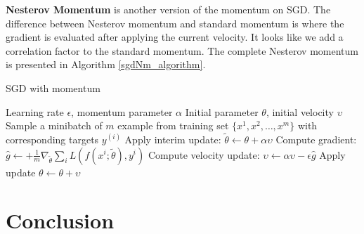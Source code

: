 \textbf{Nesterov Momentum} is another version of the momentum on SGD. The difference between Nesterov momentum and standard momentum is where the gradient is evaluated after applying the current velocity. It looks like we add a correlation factor to the standard momentum. The complete Nesterov momentum is presented in Algorithm \ref{sgdNm_algorithm}.

\begin{algorithm}
	\caption{SGD with momentum}
	\label{sgdNm_algorithm}
	\begin{algorithmic}
		\REQUIRE Learning rate $\epsilon$, momentum parameter $\alpha$
		\REQUIRE Initial parameter $\theta$, initial velocity $\upsilon$
			\STATE Sample a minibatch of $m$ example from training set $\{ x^1,x^2,\ldots, x^m \}$ with corresponding targets $y^{(i)}$
			\STATE Apply interim update: $\tilde{\theta} \leftarrow \theta + \alpha \upsilon$
			\STATE Compute gradient: $\hat{g} \leftarrow + \frac{1}{m} \nabla_{\tilde{\theta}} \sum_i L(f(x^i;\tilde{\theta}), y^i) $
			\STATE Compute velocity update: $\upsilon \leftarrow \alpha \upsilon - \epsilon \hat{g} $
			\STATE Apply update $\theta \leftarrow \theta + \upsilon$
		\ENDWHILE
	\end{algorithmic}
\end{algorithm}

\section{Conclusion}
